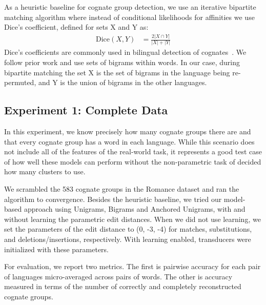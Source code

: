 \documentclass[11pt,a4paper]{article}
\begin{document}
As a heuristic baseline for cognate group detection, we use an iterative
bipartite matching algorithm where instead of conditional likelihoods
for affinities we use Dice's coefficient, defined for sets X and
Y as:
\begin{equation}
  \begin{split}
    \mathrm{Dice}(X,Y) &= \frac{2 |X\cap Y|}{|X| + |Y|}
   \end{split}
 \end{equation}
Dice's coefficients are commonly used in bilingual detection of
cognates~\cite{Kondrak01identifyingcognates,Kondrak03cognatescan}. We
follow prior work and use sets of bigrams within words. In our case,
during bipartite matching the set X is the set of bigrams in the
language being re-permuted, and Y is the union of bigrams in the other languages.

\subsection{Experiment 1: Complete Data}

In this experiment, we know precisely how many cognate groups there
are and that every cognate group has a word in each language. While
this scenario does not include all of the features of the real-world
task, it represents a good test case of how well these models can
perform without the non-parametric task of decided how many clusters
to use.

We scrambled the 583 cognate groups in the Romance dataset and ran
the algorithm to convergence. Besides the heuristic baseline, we
tried our model-based approach using Unigrams, Bigrams and Anchored
Unigrams, with and without learning the parametric edit distances.
When we did not use learning, we set the parameters of the edit
distance to (0, -3, -4) for matches, substitutions, and
deletions/insertions, respectively. With learning enabled, transducers
were initialized with these parameters.

For evaluation, we report two metrics. The first is pairwise accuracy
for each pair of languages micro-averaged across pairs of words.
The other is accuracy measured in terms of the number of correctly
and completely reconstructed cognate groups.
\end{document}
